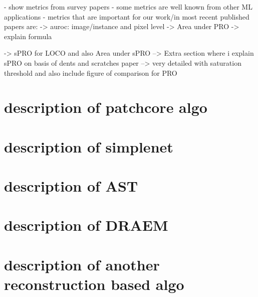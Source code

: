- show metrics from survey papers
- some metrics are well known from other ML applications
- metrics that are important for our work/in most recent published papers are:
-> auroc: image/instance and pixel level
-> Area under PRO
-> explain formula

-> sPRO for LOCO and also Area under sPRO
--> Extra section where i explain sPRO on basis of dents and scratches paper
--> very detailed with saturation threshold and also include figure of comparison for PRO




\section{description of patchcore algo}


\section{description of simplenet}

\section{description of AST}

\section{description of DRAEM}

\section{description of another reconstruction based algo}
















